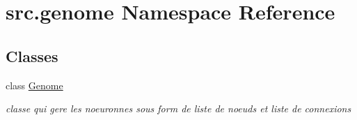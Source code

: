 \hypertarget{namespacesrc_1_1genome}{}\section{src.\+genome Namespace Reference}
\label{namespacesrc_1_1genome}
\subsection*{Classes}
\begin{DoxyCompactItemize}
\item 
class \hyperlink{classsrc_1_1genome_1_1_genome}{Genome}
\begin{DoxyCompactList}\small\item\em classe qui gere les noeuronnes sous form de liste de noeuds et liste de connexions \end{DoxyCompactList}\end{DoxyCompactItemize}
